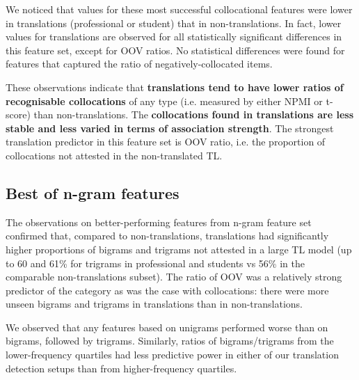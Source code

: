 We noticed that values for these most successful collocational features were lower in translations (professional or student) that in non-translations. In fact, lower values for translations are observed for all statistically significant differences in this feature set, except for OOV ratios. No statistical differences were found for features that captured the ratio of negatively-collocated items. 

These observations indicate that \textbf{translations tend to have lower ratios of recognisable collocations} of any type (i.e. measured by either NPMI or t-score) than non-translations. The \textbf{collocations found in translations are less stable and less varied in terms of association strength}. The strongest translation predictor in this feature set is OOV ratio, i.e. the proportion of collocations not attested in the non-translated TL.

%
%

\subsection{\label{ssec:best_ngram}Best of n-gram features} 
The observations on better-performing features from n-gram feature set confirmed that, compared to non-translations, translations had significantly higher proportions of bigrams and trigrams not attested in a large TL model (up to 60 and 61\% for trigrams in professional and students vs 56\% in the comparable non-translations subset). The ratio of OOV was a relatively strong predictor of the category as was the case with collocations: there were more unseen bigrams and trigrams in translations than in non-translations. %

We observed that any features based on unigrams performed worse than on bigrams, followed by trigrams. 
Similarly, ratios of bigrams/trigrams from the lower-frequency quartiles had less predictive power in either of our translation detection setups than from higher-frequency quartiles.

